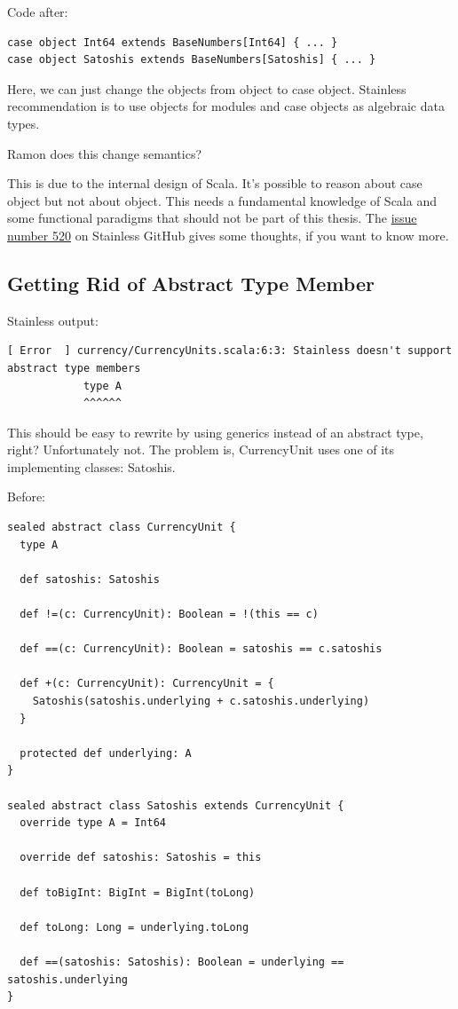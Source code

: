 \documentclass[runningheads]{llncs}
\newcommand{\todo}[1]{{\par \color{red}#1}}
\begin{document}
Code after:
\begin{lstlisting}[style=scala]
case object Int64 extends BaseNumbers[Int64] { ... }
case object Satoshis extends BaseNumbers[Satoshis] { ... }
\end{lstlisting}

Here, we can just change the objects from object to case object.
Stainless recommendation is to use objects for modules and case objects as algebraic data types.

\todo{Ramon does this change semantics?}

This is due to the internal design of Scala.
It's possible to reason about case object but not about object.
This needs a fundamental knowledge of Scala and some functional paradigms that should not be part of this thesis.
The \href{https://github.com/epfl-lara/stainless/issues/520}{issue number 520} on Stainless GitHub gives some thoughts, if you want to know more.


\subsection{Getting Rid of Abstract Type Member}

Stainless output:
\begin{lstlisting}[style=stainless]
[ Error  ] currency/CurrencyUnits.scala:6:3: Stainless doesn't support abstract type members
            type A
            ^^^^^^
\end{lstlisting}

This should be easy to rewrite by using generics instead of an abstract type, right?
Unfortunately not.
The problem is, CurrencyUnit uses one of its implementing classes: Satoshis.

Before:
\begin{lstlisting}[style=scala]
sealed abstract class CurrencyUnit {
  type A

  def satoshis: Satoshis

  def !=(c: CurrencyUnit): Boolean = !(this == c)

  def ==(c: CurrencyUnit): Boolean = satoshis == c.satoshis

  def +(c: CurrencyUnit): CurrencyUnit = {
    Satoshis(satoshis.underlying + c.satoshis.underlying)
  }

  protected def underlying: A
}

sealed abstract class Satoshis extends CurrencyUnit {
  override type A = Int64

  override def satoshis: Satoshis = this

  def toBigInt: BigInt = BigInt(toLong)

  def toLong: Long = underlying.toLong

  def ==(satoshis: Satoshis): Boolean = underlying == satoshis.underlying
}
\end{lstlisting}
\end{document}
